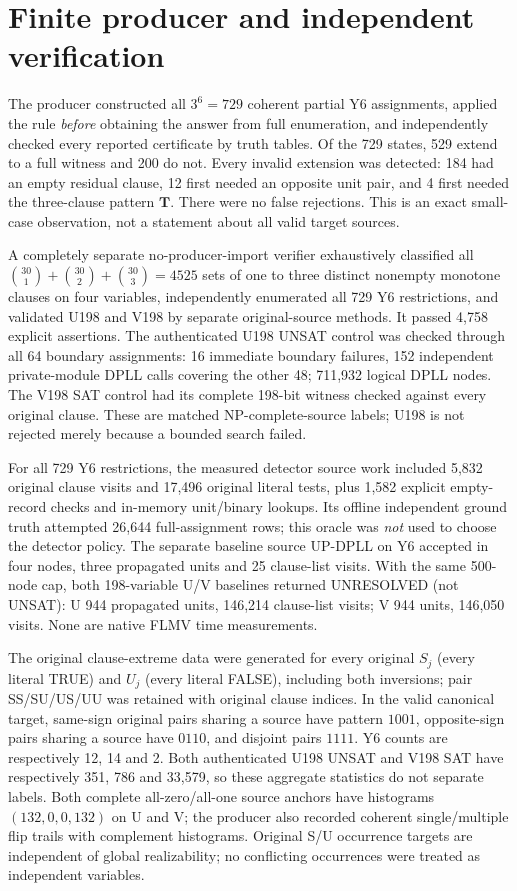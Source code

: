 \documentclass[11pt]{article}
\begin{document}
\section{Finite producer and independent verification}
The producer constructed all $3^6=729$ coherent partial Y6 assignments, applied the rule \emph{before} obtaining the answer from full enumeration, and independently checked every reported certificate by truth tables. Of the 729 states, 529 extend to a full witness and 200 do not. Every invalid extension was detected: 184 had an empty residual clause, 12 first needed an opposite unit pair, and 4 first needed the three-clause pattern $\mathbf T$. There were no false rejections. This is an exact small-case observation, not a statement about all valid target sources.

A completely separate no-producer-import verifier exhaustively classified all $\binom{30}{1}+\binom{30}{2}+\binom{30}{3}=4525$ sets of one to three distinct nonempty monotone clauses on four variables, independently enumerated all 729 Y6 restrictions, and validated U198 and V198 by separate original-source methods. It passed 4,758 explicit assertions. The authenticated U198 UNSAT control was checked through all 64 boundary assignments: 16 immediate boundary failures, 152 independent private-module DPLL calls covering the other 48; 711,932 logical DPLL nodes. The V198 SAT control had its complete 198-bit witness checked against every original clause. These are matched NP-complete-source labels; U198 is not rejected merely because a bounded search failed.

For all 729 Y6 restrictions, the measured detector source work included 5,832 original clause visits and 17,496 original literal tests, plus 1,582 explicit empty-record checks and in-memory unit/binary lookups. Its offline independent ground truth attempted 26,644 full-assignment rows; this oracle was \emph{not} used to choose the detector policy. The separate baseline source UP-DPLL on Y6 accepted in four nodes, three propagated units and 25 clause-list visits. With the same 500-node cap, both 198-variable U/V baselines returned UNRESOLVED (not UNSAT): U 944 propagated units, 146,214 clause-list visits; V 944 units, 146,050 visits. None are native FLMV time measurements.

The original clause-extreme data were generated for every original $S_j$ (every literal TRUE) and $U_j$ (every literal FALSE), including both inversions; pair SS/SU/US/UU was retained with original clause indices. In the valid canonical target, same-sign original pairs sharing a source have pattern $1001$, opposite-sign pairs sharing a source have $0110$, and disjoint pairs $1111$. Y6 counts are respectively 12, 14 and 2. Both authenticated U198 UNSAT and V198 SAT have respectively 351, 786 and 33,579, so these aggregate statistics do not separate labels. Both complete all-zero/all-one source anchors have histograms $(132,0,0,132)$ on U and V; the producer also recorded coherent single/multiple flip trails with complement histograms. Original S/U occurrence targets are independent of global realizability; no conflicting occurrences were treated as independent variables.
\end{document}
